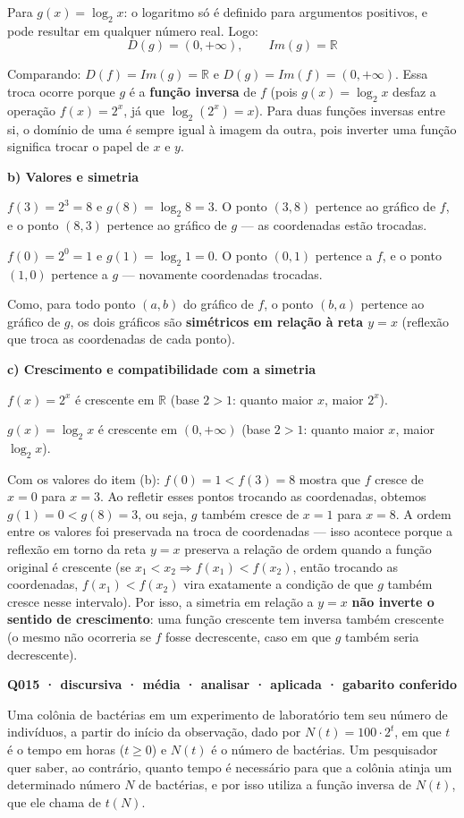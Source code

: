\documentclass[11pt,a4paper]{article}
\begin{document}
Para $g(x) = \log_2 x$: o logaritmo só é definido para argumentos positivos, e pode resultar em qualquer número real. Logo:
$$D(g) = (0, +\infty), \qquad Im(g) = \mathbb{R}$$

Comparando: $D(f) = Im(g) = \mathbb{R}$ e $D(g) = Im(f) = (0,+\infty)$. Essa troca ocorre porque $g$ é a \textbf{função inversa} de $f$ (pois $g(x)=\log_2 x$ desfaz a operação $f(x)=2^x$, já que $\log_2(2^x)=x$). Para duas funções inversas entre si, o domínio de uma é sempre igual à imagem da outra, pois inverter uma função significa trocar o papel de $x$ e $y$.

\textbf{b) Valores e simetria}

$f(3) = 2^3 = 8$ e $g(8) = \log_2 8 = 3$. O ponto $(3,8)$ pertence ao gráfico de $f$, e o ponto $(8,3)$ pertence ao gráfico de $g$ — as coordenadas estão trocadas.

$f(0) = 2^0 = 1$ e $g(1) = \log_2 1 = 0$. O ponto $(0,1)$ pertence a $f$, e o ponto $(1,0)$ pertence a $g$ — novamente coordenadas trocadas.

Como, para todo ponto $(a,b)$ do gráfico de $f$, o ponto $(b,a)$ pertence ao gráfico de $g$, os dois gráficos são \textbf{simétricos em relação à reta $y = x$} (reflexão que troca as coordenadas de cada ponto).

\textbf{c) Crescimento e compatibilidade com a simetria}

$f(x)=2^x$ é crescente em $\mathbb{R}$ (base $2>1$: quanto maior $x$, maior $2^x$).

$g(x)=\log_2 x$ é crescente em $(0,+\infty)$ (base $2>1$: quanto maior $x$, maior $\log_2 x$).

Com os valores do item (b): $f(0)=1 < f(3)=8$ mostra que $f$ cresce de $x=0$ para $x=3$. Ao refletir esses pontos trocando as coordenadas, obtemos $g(1)=0 < g(8)=3$, ou seja, $g$ também cresce de $x=1$ para $x=8$. A ordem entre os valores foi preservada na troca de coordenadas — isso acontece porque a reflexão em torno da reta $y=x$ preserva a relação de ordem quando a função original é crescente (se $x_1<x_2 \Rightarrow f(x_1)<f(x_2)$, então trocando as coordenadas, $f(x_1) < f(x_2)$ vira exatamente a condição de que $g$ também cresce nesse intervalo). Por isso, a simetria em relação a $y=x$ \textbf{não inverte o sentido de crescimento}: uma função crescente tem inversa também crescente (o mesmo não ocorreria se $f$ fosse decrescente, caso em que $g$ também seria decrescente).

\bigskip\noindent\textbf{Q015 · discursiva · média · analisar · aplicada · gabarito conferido}\par\nopagebreak
Uma colônia de bactérias em um experimento de laboratório tem seu número de indivíduos, a partir do início da observação, dado por $N(t) = 100 \cdot 2^{t}$, em que $t$ é o tempo em horas ($t \geq 0$) e $N(t)$ é o número de bactérias. Um pesquisador quer saber, ao contrário, quanto tempo é necessário para que a colônia atinja um determinado número $N$ de bactérias, e por isso utiliza a função inversa de $N(t)$, que ele chama de $t(N)$.
\end{document}

